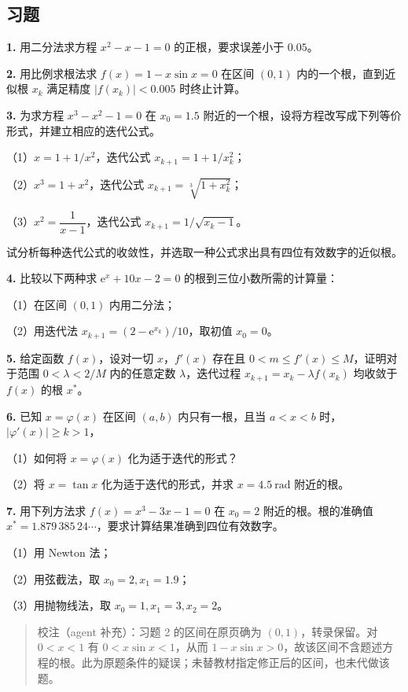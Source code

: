 \subsection{习题}\label{ch06-ux4e60ux9898}

\textbf{1.} 用二分法求方程 \(x^2-x-1=0\) 的正根，要求误差小于 \(0.05\)。

\textbf{2.} 用比例求根法求 \(f(x)=1-x\sin x=0\) 在区间 \((0,1)\) 内的一个根，直到近似根 \(x_k\) 满足精度 \(|f(x_k)|<0.005\) 时终止计算。

\textbf{3.} 为求方程 \(x^3-x^2-1=0\) 在 \(x_0=1.5\) 附近的一个根，设将方程改写成下列等价形式，并建立相应的迭代公式。

（1）\(x=1+1/x^2\)，迭代公式 \(x_{k+1}=1+1/x_k^2\)；

（2）\(x^3=1+x^2\)，迭代公式 \(x_{k+1}=\sqrt[3]{1+x_k^2}\)；

（3）\(x^2=\dfrac{1}{x-1}\)，迭代公式 \(x_{k+1}=1/\sqrt{x_k-1}\)。

试分析每种迭代公式的收敛性，并选取一种公式求出具有四位有效数字的近似根。

\textbf{4.} 比较以下两种求 \(\mathrm{e}^x+10x-2=0\) 的根到三位小数所需的计算量：

（1）在区间 \((0,1)\) 内用二分法；

（2）用迭代法 \(x_{k+1}=(2-\mathrm{e}^{x_k})/10\)，取初值 \(x_0=0\)。

\textbf{5.} 给定函数 \(f(x)\)，设对一切 \(x\)，\(f'(x)\) 存在且 \(0<m\leqslant f'(x)\leqslant M\)，证明对于范围 \(0<\lambda<2/M\) 内的任意定数 \(\lambda\)，迭代过程 \(x_{k+1}=x_k-\lambda f(x_k)\) 均收敛于 \(f(x)\) 的根 \(x^*\)。

\textbf{6.} 已知 \(x=\varphi(x)\) 在区间 \((a,b)\) 内只有一根，且当 \(a<x<b\) 时，\(|\varphi'(x)|\geqslant k>1\)，

（1）如何将 \(x=\varphi(x)\) 化为适于迭代的形式？

（2）将 \(x=\tan x\) 化为适于迭代的形式，并求 \(x=4.5\ \mathrm{rad}\) 附近的根。

\textbf{7.} 用下列方法求 \(f(x)=x^3-3x-1=0\) 在 \(x_0=2\) 附近的根。根的准确值 \(x^*=1.879\,385\,24\cdots\)，要求计算结果准确到四位有效数字。

（1）用 Newton 法；

（2）用弦截法，取 \(x_0=2,x_1=1.9\)；

（3）用抛物线法，取 \(x_0=1,x_1=3,x_2=2\)。

\begin{quote}
校注（agent 补充）：习题 2 的区间在原页确为 \((0,1)\)，转录保留。对 \(0<x<1\) 有 \(0<x\sin x<1\)，从而 \(1-x\sin x>0\)，故该区间不含题述方程的根。此为原题条件的疑误；未替教材指定修正后的区间，也未代做该题。
\end{quote}

